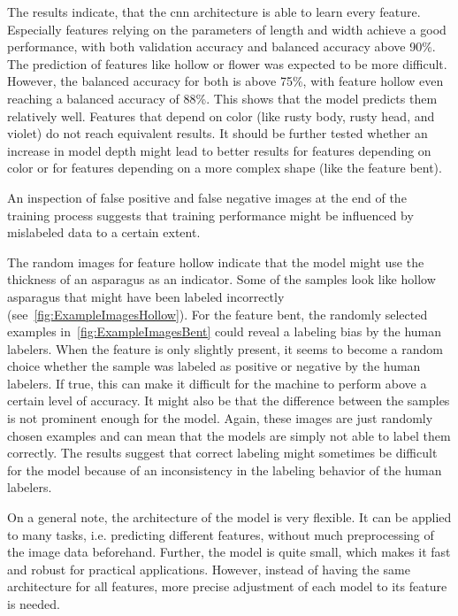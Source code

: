 \bigskip
The results indicate, that the \acrshort{cnn} architecture is able to learn every feature. Especially features relying on the parameters of length and width achieve a good performance, with both validation accuracy and balanced accuracy above 90\%. The prediction of features like hollow or flower was expected to be more difficult. However, the balanced accuracy for both is above 75\%, with feature hollow even reaching a balanced accuracy of 88\%. This shows that the model predicts them relatively well. Features that depend on color (like rusty body, rusty head, and violet) do not reach equivalent results. It should be further tested whether an increase in model depth might lead to better results for features depending on color or for features depending on a more complex shape (like the feature bent).
 
An inspection of false positive and false negative images at the end of the training process suggests that training performance might be influenced by mislabeled data to a certain extent.
 
The random images for feature hollow indicate that the model might use the thickness of an asparagus as an indicator. Some of the samples look like hollow asparagus that might have been labeled incorrectly (see~\autoref{fig:ExampleImagesHollow}).
For the feature bent, the randomly selected examples in~\autoref{fig:ExampleImagesBent} could reveal a labeling bias by the human labelers. When the feature is only slightly present, it seems to become a random choice whether the sample was labeled as positive or negative by the human labelers. If true, this can make it difficult for the machine to perform above a certain level of accuracy. It might also be that the difference between the samples is not prominent enough for the model.
Again, these images are just randomly chosen examples and can mean that the models are simply not able to label them correctly. The results suggest that correct labeling might sometimes be difficult for the model because of an inconsistency in the labeling behavior of the human labelers.
 
On a general note, the architecture of the model is very flexible. It can be applied to many tasks, i.e. predicting different features, without much preprocessing of the image data beforehand. Further, the model is quite small, which makes it fast and robust for practical applications. However, instead of having the same architecture for all features, more precise adjustment of each model to its feature is needed.
 

